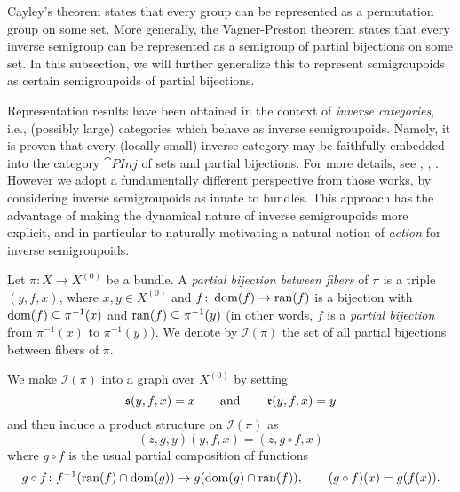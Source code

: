 Cayley's theorem states that every group can be represented as a permutation group on some set. More generally, the Vagner-Preston theorem states that every inverse semigroup can be represented as a semigroup of partial bijections on some set. In this subsection, we will further generalize this to represent semigroupoids as certain semigroupoids of partial bijections.

Representation results have been obtained in the context of \emph{inverse categories}, i.e., (possibly large) categories which behave as inverse semigroupoids. Namely, it is proven that every (locally small) inverse category may be faithfully embedded into the category $\cat{PInj}$ of sets and partial bijections. For more details, see \cite[p.\ 87]{MR0506554}, \cite[Theorem 3.8]{MR1871071}, \cite[Proposition 3.11]{MR3093088}. However we adopt a fundamentally different perspective from those works, by considering inverse semigroupoids as innate to bundles. This approach has the advantage of making the dynamical nature of inverse semigroupoids more explicit, and in particular to naturally motivating a natural notion of \emph{action} for inverse semigroupoids.

Let $\pi\colon X\to X^{(0)}$ be a bundle. A \emph{partial bijection between fibers} of $\pi$ is a triple $(y,f,x)$, where $x,y\in X^{(0)}$ and $f\colon\operatorname{dom}(f)\to\operatorname{ran}(f)$ is a bijection with $\operatorname{dom}(f)\subseteq\pi^{-1}(x)$ and $\operatorname{ran}(f)\subseteq\pi^{-1}(y)$ (in other words, $f$ is a \emph{partial bijection} from $\pi^{-1}(x)$ to $\pi^{-1}(y)$). We denote by $\mathcal{I}(\pi)$ the set of all partial bijections between fibers of $\pi$.

We make $\mathcal{I}(\pi)$ into a graph over $X^{(0)}$ by setting
\[\operatorname{\mathfrak{s}}(y,f,x)=x\qquad\text{and}\qquad\operatorname{\mathfrak{r}}(y,f,x)=y\]
and then induce a product structure on $\mathcal{I}(\pi)$ as
\[(z,g,y)(y,f,x)=(z,g\circ f,x)\]
where $g\circ f$ is the usual partial composition of functions
\[g\circ f\colon f^{-1}(\operatorname{ran}(f)\cap\operatorname{dom}(g))\to g(\operatorname{dom}(g)\cap\operatorname{ran}(f)),\qquad (g\circ f)(x)=g(f(x)).\]

